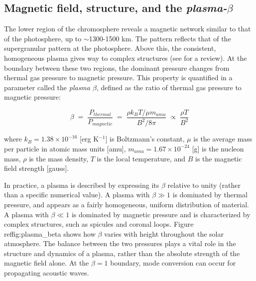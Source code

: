 



\clearpage
\subsection{Magnetic field, structure, and the \textit{plasma-$\beta$}}



The lower region of the chromosphere reveals
a magnetic network similar to that of the photosphere, up to
$\sim$1300-1500 km. The pattern reflects that of the supergranular
pattern at the photosphere. Above this, the consistent, homogeneous
plasma gives way to complex structures (see \cite{Judge2006} for a
review). At the boundary between these two regions, the dominant
pressure changes from thermal gas pressure to magnetic pressure. This
property is quantified in a parameter called the \textit{plasma
$\beta$}, defined as the ratio of thermal gas pressure to magnetic
pressure:

\begin{equation}
    \beta \;=\; \frac{P_{thermal}}{P_{magnetic}}
    \;=\; \frac{\rho k_{B}T/\mu m_{amu}}{B^{2}/8\pi}
    \;\propto\; \frac{\rho T}{B^{2}}
\end{equation}

where $k_{B} = 1.38 \times 10^{-16}$ [erg K$^{-1}$] is Boltzmann's
constant, $\mu$ is the average mass per particle in atomic mass units
[amu], $m_{amu} = 1.67 \times 10^{-24}$ [g] is the nucleon mass, $\rho$
is the mass density, $T$ is the local temperature, and $B$ is the
magnetic field strength [gauss].

In practice, a plasma is described by expressing its $\beta$
relative to unity (rather than a specific numerical value). A plasma
with $\beta \gg 1$ is dominated by thermal pressure, and appears as a
fairly homogeneous, uniform distribution of material. A plasma with
$\beta \ll 1$ is dominated by magnetic pressure and is characterized
by complex structures, such as spicules and coronal loops.
Figure~\\ref{fig:plasma\_beta}
shows how $\beta$ varies with height
throughout the solar atmosphere. The balance between the two pressures
plays a vital role in the structure and dynamics of a plasma, rather
than the absolute strength of the magnetic field alone. At the
$\beta=1$ boundary, mode conversion can occur for propagating acoustic
waves.

